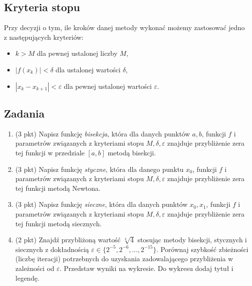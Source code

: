 \documentclass[12pt,a4paper]{article}
\theoremstyle{definition}
\begin{document}
\subsection*{Kryteria stopu}
Przy decyzji o tym, ile kroków danej metody wykonać możemy zastosować jedno z następujących kryteriów:
\begin{itemize}
	\item $k> M$ dla pewnej ustalonej liczby $M$,
	\item $|f(x_k)|<\delta$ dla ustalonej wartości $\delta$,
	\item $|x_k-x_{k+1}|<\varepsilon$ dla pewnej ustalonej wartości $\varepsilon$.
\end{itemize}



\subsection*{Zadania}
\begin{enumerate}
	
	
	\item (3 pkt) Napisz funkcję \emph{bisekcja}, która dla danych punktów $a,b$, funkcji $f$ i parametrów związanych z kryteriami stopu $M,\delta,\varepsilon$ znajduje przybliżenie zera tej funkcji w przedziale $[a,b]$ metodą bisekcji.
	
	\item (3 pkt) Napisz funkcję \emph{styczne}, która dla danego punktu $x_0$, funkcji $f$ i parametrów związanych z kryteriami stopu $M,\delta,\varepsilon$ znajduje przybliżenie zera tej funkcji metodą Newtona.
	
	\item (3 pkt) Napisz funkcję \emph{sieczne}, która dla danych punktów $x_0,x_1$, funkcji $f$ i parametrów związanych z kryteriami stopu $M,\delta,\varepsilon$ znajduje przybliżenie zera tej funkcji metodą siecznych.
	
	\item (2 pkt) Znajdź przybliżoną wartość $\sqrt[4]{4}$ stosując metody bisekcji, stycznych i siecznych z dokładnością $\varepsilon\in\{2^{-5},2^{-6},\ldots,2^{-15}\}$. Porównaj szybkość zbieżności (liczbę iteracji) potrzebnych do uzyskania zadowalającego przybliżenia w zależności od $\varepsilon$. Przedstaw wyniki na wykresie. Do wykresu dodaj tytuł i legendę.
	

\end{enumerate}
\end{document}
